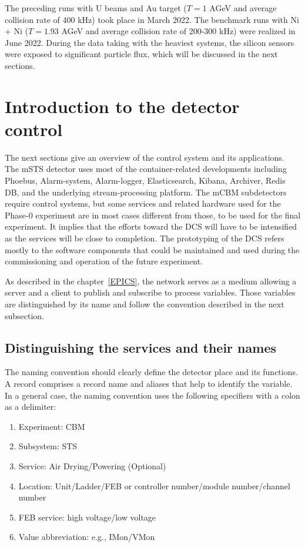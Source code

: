 The preceding runs with U beams and Au target ($T = 1$ AGeV and average collision rate of 400 kHz) took place in March 2022. The benchmark runs with Ni + Ni ($T = 1.93$ AGeV and average collision rate of 200-300 kHz) were realized in June 2022. During the data taking with the heaviest systems, the silicon sensors were exposed to significant particle flux, which will be discussed in the next sections. 
\section{Introduction to the detector control}
The next sections give an overview of the control system and its applications. The \gls{mSTS} detector uses most of the container-related developments including Phoebus, Alarm-system, Alarm-logger, Elasticsearch, Kibana, Archiver, Redis \gls{DB}, and the underlying stream-processing platform. The \gls{mCBM} subdetectors require control systems, but some services and related hardware used for the Phase-0 experiment are in most cases different from those, to be used for the final experiment. It implies that the efforts toward the \gls{DCS} will have to be intensified as the services will be close to completion. The prototyping of the \gls{DCS} refers mostly to the software components that could be maintained and used during the commissioning and operation of the future experiment. 

As described in the chapter~\ref{EPICS}, the network serves as a medium allowing a server and a client to publish and subscribe to process variables. Those variables are distinguished by its name and follow the convention described in the next subsection.
\subsection{Distinguishing the services and their names}
The naming convention should clearly define the detector place and its functions.  A record comprises a record name and aliases that help to identify the variable. In a general case, the naming convention uses the following specifiers with a colon as a delimiter:
\begin{enumerate} 
\item Experiment: \gls{CBM}
\item Subsystem: \gls{STS}
\item Service: Air Drying/Powering (Optional)
\item Location: Unit/Ladder/FEB or controller number/module number/channel number
\item \gls{FEB} service: high voltage/low voltage
\item Value abbreviation: e.g., IMon/VMon
\end{enumerate}

